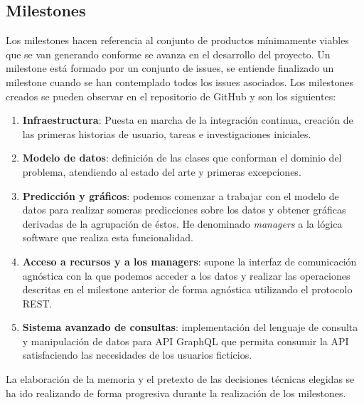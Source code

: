 \subsection{Milestones}
Los milestones hacen referencia al conjunto de productos mínimamente viables que se van
generando conforme se avanza en el desarrollo del proyecto. Un milestone está formado por
un conjunto de issues, se entiende finalizado un milestone cuando se han contemplado todos
los issues asociados. Los milestones creados se pueden observar en el repositorio de
GitHub y son los siguientes:
\begin{enumerate}
    \item \textbf{Infraestructura}: Puesta en marcha de la integración continua, creación
    de las primeras historias de usuario, tareas e investigaciones iniciales.
    \item \textbf{Modelo de datos}: definición de las clases que conforman el dominio del
    problema, atendiendo al estado del arte y primeras excepciones. 
    \item \textbf{Predicción y gráficos}: podemos comenzar a trabajar con el modelo de
    datos para realizar someras predicciones sobre los datos y obtener gráficas derivadas
    de la agrupación de éstos. He denominado \textit{managers} a la lógica software que
    realiza esta funcionalidad.
    \item \textbf{Acceso a recursos y a los managers}: supone la interfaz de comunicación
    agnóstica con la que podemos acceder a los datos y realizar las operaciones descritas
    en el milestone anterior de forma agnóstica utilizando el protocolo REST.
    \item \textbf{Sistema avanzado de consultas}: implementación del lenguaje de consulta
    y manipulación de datos para API GraphQL que permita consumir la API satisfaciendo las
    necesidades de los usuarios ficticios.
\end{enumerate}

La elaboración de la memoria y el pretexto de las decisiones técnicas elegidas 
se ha ido realizando de forma progresiva durante la realización de los milestones.


